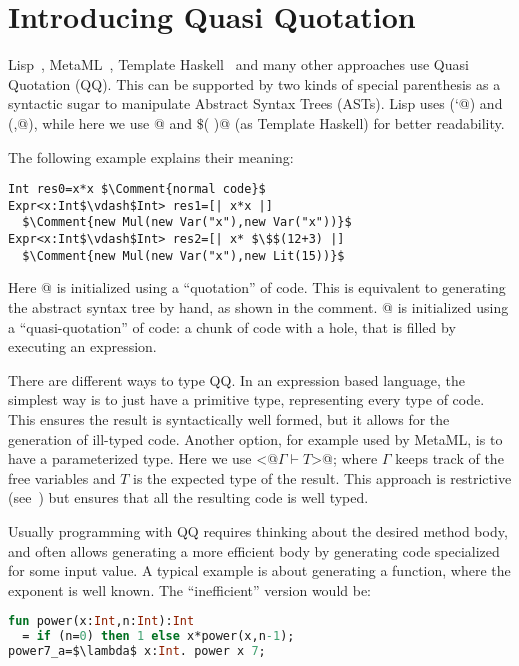 
\section{Introducing Quasi Quotation}

Lisp~\cite{pitman1980special}, MetaML~\cite{moggi1999idealized}, Template Haskell~\cite{sheard2002template} and many other approaches use Quasi Quotation (QQ).
This can be supported by two kinds of special parenthesis as a syntactic sugar to manipulate Abstract Syntax Trees (ASTs).
Lisp uses (\Q@`@) and (\Q@,@), while here we use
\Q@[|  |]@  and \Q@$\$$(  )@ (as Template Haskell) 
for better readability.

\noindent
The following example explains their meaning: 

\begin{lstlisting}
Int res0=x*x $\Comment{normal code}$
Expr<x:Int$\vdash$Int> res1=[| x*x |]
  $\Comment{new Mul(new Var("x"),new Var("x"))}$
Expr<x:Int$\vdash$Int> res2=[| x* $\$$(12+3) |]
  $\Comment{new Mul(new Var("x"),new Lit(15))}$
\end{lstlisting}

\noindent
Here @ is initialized using a ``quotation'' of code.
This is equivalent to generating the abstract syntax tree by hand, as shown in the comment.
@ is initialized using a ``quasi-quotation'' of code: a chunk of code with a hole, that is filled by executing an expression.

There are different ways to type QQ.
In an expression based language, 
the simplest way is to just have a primitive \Q@Expr@ type,
representing every type of code.
This ensures the result is syntactically well formed, but
it allows for the generation of ill-typed code.
Another option, for example used by MetaML,
is to have a parameterized type.
Here we use \Q@Expr<@$\Gamma\vdash T$\Q@>@; where
$\Gamma$ keeps track of the free variables and $T$ is the expected type
of the result.
This approach is restrictive (see~\cite{servetto2014meta})
 but ensures that all the resulting code is well typed.

Usually programming with QQ requires thinking about the desired method body,
 and often allows generating a more efficient body by generating code specialized for some input value.
A typical example is about generating a \Q@pow@ function, where the exponent is well known.
The ``inefficient'' version would be:

\begin{lstlisting}[language=ML]
fun power(x:Int,n:Int):Int 
  = if (n=0) then 1 else x*power(x,n-1);
power7_a=$\lambda$ x:Int. power x 7;
\end{lstlisting}

